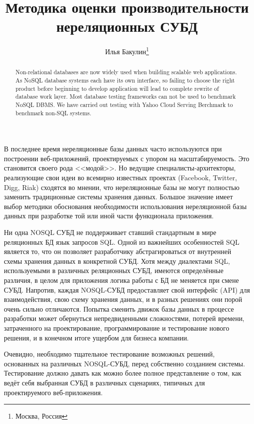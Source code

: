 \documentclass[10pt, a5paper]{article}
\begin{document}
\title{Методика оценки производительности нереляционных СУБД}
\author{Илья Бакулин\footnote{Москва, Россия}}
\date{}
\maketitle

\begin{abstract}
Non-relational databases are now widely used when building scalable web
applications. As NoSQL database systems each have its
own interface, so failing to choose the right product before beginning to
develop application will lead to complete rewrite of database work
layer. Most database testing frameworks can not be used to benchmark NoSQL 
DBMS. We have carried out testing with Yahoo Cloud Serving Berchmark to benchmark 
non-SQL systems.
\end{abstract}

В последнее время нереляционные базы данных часто используются при
построении веб-приложений, проектируемых с упором на масштабируемость.
Это становится своего рода <<модой>>. Но ведущие специалисты-архитекторы,
реализующие свои идеи во всемирно известных проектах (Facebook, Twitter,
Digg, Riak) сходятся во мнении, что нереляционные базы не могут
полностью заменить традиционные системы хранения данных. Большое
значение имеет выбор методики обоснования необходимости использования
нереляционной базы данных при разработке той или иной части функционала
приложения.

Ни одна NOSQL СУБД не поддерживает ставший стандартным в мире
реляционных БД язык запросов SQL. Одной из важнейших особенностей SQL
является то, что он позволяет разработчику абстрагироваться от
внутренней схемы хранения данных в конкретной СУБД. Хотя между
диалектами SQL, используемыми в различных реляционных СУБД, имеются
определённые различия, в целом для приложения логика работы с БД не
меняется при смене СУБД. Напротив, каждая NOSQL-СУБД предоставляет свой
интерфейс (API) для взаимодействия, свою схему хранения данных, и в
разных решениях они порой очень сильно отличаются. Попытка сменить
движок базы данных в процессе разработки может обернуться
непредвиденными сложностями, потерей времени, затраченного на
проектирование, программирование и тестирование нового решения, и в
конечном итоге ущербом для бизнеса компании.

Очевидно, необходимо тщательное тестирование возможных решений,
основанных на различных NOSQL-СУБД, перед собственно созданием системы.
Тестирование должно давать как можно более полное представление о том,
как ведёт себя выбранная СУБД в различных сценариях, типичных для
проектируемого веб-приложения.
\end{document}
